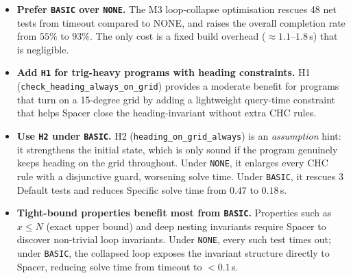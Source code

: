 \begin{itemize}[leftmargin=1.5em]

    \item \textbf{Prefer \texttt{BASIC} over \texttt{NONE}.}
    The M3 loop-collapse optimisation rescues 48 net tests from timeout compared to NONE,
    and raises the overall completion rate from $55\%$ to $93\%$.
    The only cost is a fixed build overhead ($\approx 1.1$--$1.8$\,s) that is negligible.

    \item \textbf{Add \texttt{H1} for trig-heavy programs with heading constraints.}
    H1 (\texttt{check\_heading\_always\_on\_grid})
    provides a moderate benefit for programs that turn on a 15-degree grid by adding a lightweight query-time constraint that
    helps Spacer close the heading-invariant without extra CHC rules.

    \item \textbf{Use \texttt{H2} under \texttt{BASIC}.}
    H2 (\texttt{heading\_on\_grid\_always}) is an \emph{assumption} hint: it
    strengthens the initial state, which is only sound if the program genuinely
    keeps heading on the grid throughout.  Under \texttt{NONE}, it enlarges every
    CHC rule with a disjunctive guard, worsening solve time.  Under
    \texttt{BASIC}, it rescues 3 Default tests and reduces Specific solve time
    from $0.47$ to $0.18$\,s.

   \item \textbf{Tight-bound properties benefit most from \texttt{BASIC}.}
    Properties such as $x \leq N$ (exact upper bound) and deep nesting invariants
    require Spacer to discover non-trivial loop invariants.  Under \texttt{NONE},
    every such test times out; under \texttt{BASIC}, the collapsed loop exposes the
    invariant structure directly to Spacer, reducing solve time from timeout to
    $< 0.1$\,s.

\end{itemize}
